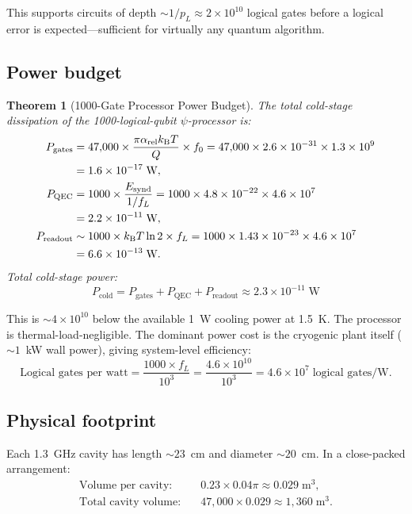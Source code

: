 \documentclass[11pt]{article}
\newtheorem{theorem}{Theorem}[section]
\theoremstyle{definition}
\theoremstyle{remark}
\newcommand{\kB}{k_{\mathrm{B}}}
\newcommand{\arel}{\alpha_{\mathrm{rel}}}
\begin{document}
This supports circuits of depth $\sim 1/p_L \approx 2\times10^{10}$
logical gates before a logical error is expected---sufficient for
virtually any quantum algorithm.

\subsection{Power budget}

\begin{theorem}[1000-Gate Processor Power Budget]
\label{thm:power-budget}
The total cold-stage dissipation of the 1000-logical-qubit $\psi$-processor is:
\begin{align}
P_{\mathrm{gates}} &= 47{,}000\times\frac{\pi\arel\kB T}{Q}\times f_0
= 47{,}000\times2.6\times10^{-31}\times1.3\times10^9
\notag\\
&= 1.6\times10^{-17}\;\text{W}, \\
P_{\mathrm{QEC}} &= 1000\times\frac{E_{\mathrm{synd}}}{1/f_L}
= 1000\times4.8\times10^{-22}\times4.6\times10^7
\notag\\
&= 2.2\times10^{-11}\;\text{W}, \\
P_{\mathrm{readout}} &\sim 1000\times\kB T\ln2\times f_L
= 1000\times1.43\times10^{-23}\times4.6\times10^7
\notag\\
&= 6.6\times10^{-13}\;\text{W}.
\end{align}
Total cold-stage power:
\begin{equation}
\boxed{
P_{\mathrm{cold}} = P_{\mathrm{gates}} + P_{\mathrm{QEC}} + P_{\mathrm{readout}}
\approx 2.3\times10^{-11}\;\text{W}
}
\label{eq:cold-power}
\end{equation}
\end{theorem}

This is $\sim 4\times10^{10}$ below the available 1~W cooling power at 1.5~K.
The processor is thermal-load-negligible. The dominant power cost is
the cryogenic plant itself ($\sim 1$~kW wall power), giving system-level
efficiency:
\begin{equation}
\text{Logical gates per watt} = \frac{1000\times f_L}{10^3}
= \frac{4.6\times10^{10}}{10^3} = 4.6\times10^7\;\text{logical gates/W}.
\end{equation}

\subsection{Physical footprint}

Each 1.3~GHz cavity has length $\sim 23$~cm and diameter $\sim 20$~cm.
In a close-packed arrangement:
\begin{align}
\text{Volume per cavity:} &\quad 0.23\times0.04\pi \approx 0.029\;\text{m}^3, \\
\text{Total cavity volume:} &\quad 47{,}000\times0.029 \approx 1{,}360\;\text{m}^3.
\end{align}
\end{document}
